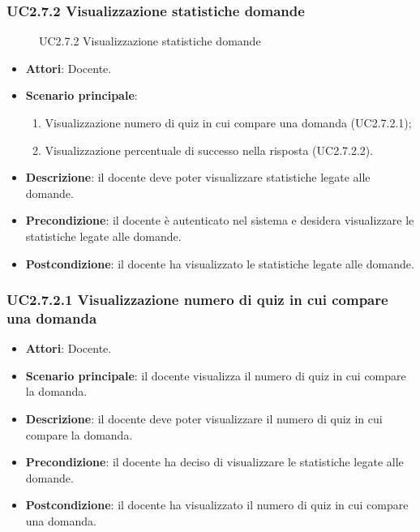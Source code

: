 \subsubsection{UC2.7.2 Visualizzazione statistiche domande}
\begin{figure}[H]
\centering
\noindent{}
\caption{UC2.7.2 Visualizzazione statistiche domande}
\end{figure}
\begin{itemize}
\item \textbf{Attori}: Docente.
\item \textbf{Scenario principale}:
\begin{enumerate}
\item Visualizzazione numero di quiz in cui compare una domanda (UC2.7.2.1);
\item Visualizzazione percentuale di successo nella risposta (UC2.7.2.2).
\end{enumerate}
\item \textbf{Descrizione}: il docente deve poter visualizzare statistiche legate alle domande.
\item \textbf{Precondizione}: il docente è autenticato nel sistema e desidera visualizzare le statistiche legate alle domande.
\item \textbf{Postcondizione}: il docente ha visualizzato le statistiche legate alle domande.
\end{itemize}
\subsubsection{UC2.7.2.1 Visualizzazione numero di quiz in cui compare una domanda}
\begin{itemize}
\item \textbf{Attori}: Docente.
\item \textbf{Scenario principale}: il docente visualizza il numero di quiz in cui compare la domanda.
\item \textbf{Descrizione}: il docente deve poter visualizzare il numero di quiz in cui compare la domanda.
\item \textbf{Precondizione}: il docente ha deciso di visualizzare le statistiche legate alle domande.
\item \textbf{Postcondizione}: il docente ha visualizzato il numero di quiz in cui compare una domanda.
\end{itemize}
